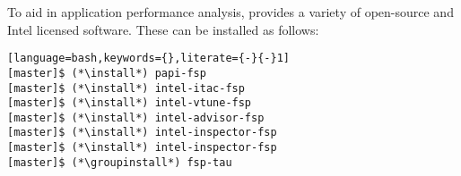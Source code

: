 To aid in application performance analysis, \FSP{} provides a variety of
open-source and Intel licensed software. These can be installed as follows:

\begin{lstlisting}[language=bash,keywords={},literate={-}{-}1]
[master]$ (*\install*) papi-fsp
[master]$ (*\install*) intel-itac-fsp
[master]$ (*\install*) intel-vtune-fsp
[master]$ (*\install*) intel-advisor-fsp
[master]$ (*\install*) intel-inspector-fsp
[master]$ (*\install*) intel-inspector-fsp
[master]$ (*\groupinstall*) fsp-tau
\end{lstlisting}
